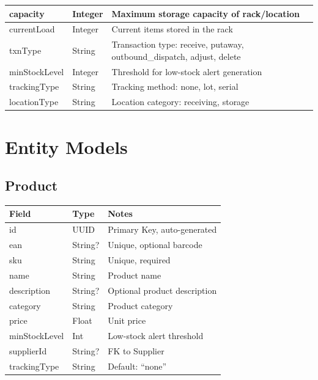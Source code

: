 \documentclass[12pt,a4paper]{report}
\begin{document}
\begin{table}[H]
\begin{tabularx}{\textwidth}{|l|l|X|}
        \hline
        capacity & Integer & Maximum storage capacity of rack/location \\
        \hline
        currentLoad & Integer & Current items stored in the rack \\
        \hline
        txnType & String & Transaction type: receive, putaway, outbound\_dispatch, adjust, delete \\
        \hline
        minStockLevel & Integer & Threshold for low-stock alert generation \\
        \hline
        trackingType & String & Tracking method: none, lot, serial \\
        \hline
        locationType & String & Location category: receiving, storage \\
        \hline
    \end{tabularx}
\end{table}

\section{Entity Models}

\subsection{Product}
\begin{table}[H]
    \centering
    \renewcommand{\arraystretch}{1.3}
    \begin{tabularx}{\textwidth}{|l|l|X|}
        \hline
        \textbf{Field} & \textbf{Type} & \textbf{Notes} \\
        \hline
        id & UUID & Primary Key, auto-generated \\
        ean & String? & Unique, optional barcode \\
        sku & String & Unique, required \\
        name & String & Product name \\
        description & String? & Optional product description \\
        category & String & Product category \\
        price & Float & Unit price \\
        minStockLevel & Int & Low-stock alert threshold \\
        supplierId & String? & FK to Supplier \\
        trackingType & String & Default: ``none'' \\
        \hline
    \end{tabularx}
\end{table}
\end{document}
